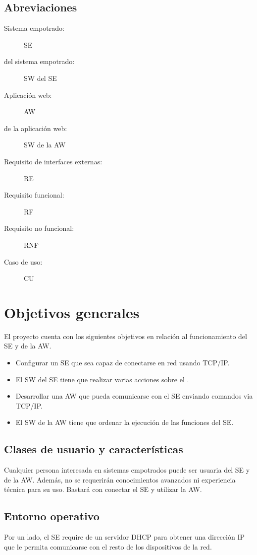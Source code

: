 \subsection{Abreviaciones} \label{sec:spec-abreviaciones}
\begin{description}
  \item[Sistema empotrado:] SE
  \item[ del sistema empotrado:] SW del SE
  \item[Aplicación web:] AW
  \item[ de la aplicación web:] SW de la AW
  \item[Requisito de interfaces externas:] RE 
  \item[Requisito funcional:] RF
  \item[Requisito no funcional:] RNF
  \item[Caso de uso:] CU
\end{description}

\section{Objetivos generales}
El proyecto cuenta con los siguientes objetivos en relación al funcionamiento
del SE y de la AW.

\begin{itemize}
  \item Configurar un SE que sea capaz de conectarse en red usando TCP/IP.
  \item El SW del SE tiene que realizar varias acciones sobre el
        .
  \item Desarrollar una AW que pueda comunicarse con el SE enviando comandos
        via TCP/IP.
  \item El SW de la AW tiene que ordenar la ejecución de las funciones del SE.
\end{itemize}

\subsection{Clases de usuario y características} \label{sec:spec-usuarios}
Cualquier persona interesada en sistemas empotrados puede ser usuaria del SE y
de la AW. Además, no se requerirán conocimientos avanzados ni experiencia técnica
para su uso. Bastará con conectar el SE y utilizar la AW.

\subsection{Entorno operativo} \label{sec:spec-entorno}
Por un lado, el SE require de un servidor DHCP para obtener una dirección IP
que le permita comunicarse con el resto de los dispositivos de la red.

